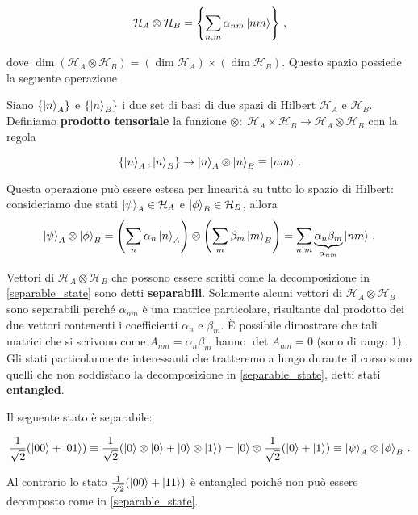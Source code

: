 \begin{equation*}
    \mathcal{H}_A \otimes \mathcal{H}_B = \left\lbrace \sum_{n,m} \alpha_{nm} \ket{nm} \right\rbrace \, ,
\end{equation*}

\noindent dove $\dim (\mathcal{H}_A \otimes \mathcal{H}_B) = (\dim \mathcal{H}_A) \times (\dim \mathcal{H}_B)$. Questo spazio possiede la seguente operazione

\begin{definizione}
    Siano $\lbrace \ket{n}_A \rbrace$ e $\lbrace \ket{n}_B \rbrace$ i due set di basi di due spazi di Hilbert $\mathcal{H}_A$ e $\mathcal{H}_B$. Definiamo \textbf{prodotto tensoriale} la funzione $\otimes: \; \mathcal{H}_A \times \mathcal{H}_B \rightarrow \mathcal{H}_A \otimes \mathcal{H}_B$ con la regola
    
    \begin{equation*}
        \lbrace \ket{n}_A, \ket{n}_B \rbrace \rightarrow \ket{n}_A \otimes \ket{n}_B \equiv \ket{nm} \, .     
    \end{equation*}
\end{definizione}

\noindent Questa operazione può essere estesa per linearità su tutto lo spazio di Hilbert: consideriamo due stati $\ket{\psi}_A \in \mathcal{H}_A$ e $\ket{\phi}_B \in \mathcal{H}_B$, allora
\begin{equation}\label{separable_state}
    \ket{\psi}_A \otimes \ket{\phi}_B = \left( \sum_n \alpha_n \ket{n}_A \right) \otimes \left( \sum_m \beta_m \ket{m}_B \right) = \sum_{n,m} \underbrace{\alpha_n \beta_m}_{\alpha_{nm}} \ket{nm} \, .
\end{equation}

\noindent Vettori di $\mathcal{H}_A \otimes \mathcal{H}_B$ che possono essere scritti come la decomposizione in \eqref{separable_state} sono detti \textbf{separabili}. Solamente alcuni vettori di $\mathcal{H}_A \otimes \mathcal{H}_B$ sono separabili perché $\alpha_{nm}$ è una matrice particolare, risultante dal prodotto dei due vettori contenenti i coefficienti $\alpha_n$ e $\beta_m$. È possibile dimostrare che tali matrici che si scrivono come $A_{nm} = \alpha_n \beta_m$ hanno $\det A_{nm} = 0$ (sono di rango 1). Gli stati particolarmente interessanti che tratteremo a lungo durante il corso sono quelli che non soddisfano la decomposizione in \eqref{separable_state}, detti stati \textbf{entangled}. 

\begin{esempio}
    Il seguente stato è separabile:
    
    \begin{equation*}
        \frac{1}{\sqrt{2}} (\ket{00} + \ket{01}) \equiv \frac{1}{\sqrt{2}} (\ket{0} \otimes \ket{0} + \ket{0} \otimes \ket{1}) = \ket{0} \otimes \frac{1}{\sqrt{2}} (\ket{0} + \ket{1}) \equiv \ket{\psi}_A \otimes \ket{\phi}_B \, .
    \end{equation*}
    
    \noindent Al contrario lo stato $\frac{1}{\sqrt{2}} (\ket{00} + \ket{11})$ è entangled poiché non può essere decomposto come in \eqref{separable_state}. 
\end{esempio}

